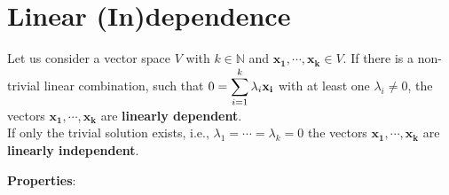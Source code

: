 \section{Linear (In)dependence \cite{mfml-1}}\label{Linear (In)dependence}

Let us consider a vector space $V$ with $k \in \mathbb{N}$ and $\mathbf{x_1, \cdots, x_k} \in V$. If there is a non-trivial linear combination, such that $0 = \displaystyle\sum^k_{i=1} \lambda_i\mathbf{x_i}$ with at least one $\lambda_i \neq 0$, the vectors $\mathbf{x_1, \cdots, x_k}$ are \textbf{linearly dependent}. \\If only the trivial solution exists, i.e., $\lambda_1 = \cdots = \lambda_k = 0$ the vectors $\mathbf{x_1, \cdots, x_k}$ are \textbf{linearly independent}.

\vspace{0.3cm}
\noindent\textbf{Properties}:
